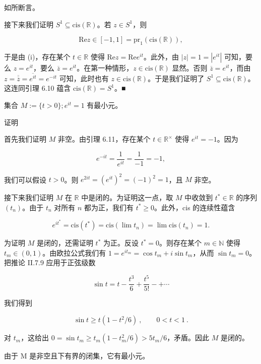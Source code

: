 \begin{lemma}
\begin{subitems}
如所断言。

\item

接下来我们证明 $ S^1 \subseteq \mathrm{cis}(\mathbb{R}) $。若 $ z \in S^1 $，则

\[
\mathrm{R e}z\in[-1,1]=\mathrm{p r}_{1}\left(\mathrm{c i s}(\mathbb{R})\right),
\]

于是由 (i)，存在某个 $t \in \mathbb{R}$ 使得 $\mathrm{Re} z = \mathrm{Re} e^{it}$。此外，由 $|z| = 1 = |e^{it}|$ 可知，要么 $z = e^{it}$，要么 $\overline{z} = e^{it}$。在第一种情形，$z \in \mathrm{cis}(\mathbb{R})$ 显然。否则 $\overline{z} = e^{it}$，而由 $z = \overline{\overline{z}} = \overline{e^{it}} = e^{-it}$ 可知，此时也有 $z \in \mathrm{cis}(\mathbb{R})$。于是我们证明了 $S^{1} \subseteq \mathrm{cis}(\mathbb{R})$。这连同引理 6.10 蕴含 $\mathrm{cis}(\mathbb{R}) = S^{1}$。■

\end{subitems}

\end{lemma}

\begin{lemma}

集合 $ M := \{t > 0\}; e^{it} = 1 $ 有最小元。

证明

\begin{subitems}
\item

首先我们证明 $ M $ 非空。由引理 6.11，存在某个 $ t \in \mathbb{R}^\times $ 使得 $ e^{it} = -1 $。因为

\[
e^{-it}=\frac{1}{e^{it}}=\frac{1}{-1}=-1,
\]

我们可以假设 $t>0$。则 $e^{2it}=(e^{it})^2=(-1)^2=1$，且 $M$ 非空。

\item

接下来我们证明 $ M $ 在 $ \mathbb{R} $ 中是闭的。为证明这一点，取 $ M $ 中收敛到 $ t^* \in \mathbb{R} $ 的序列 $ (t_n) $。由于 $ t_n $ 对所有 $ n $ 都为正，我们有 $ t^* \geq 0 $。此外，cis 的连续性蕴含

\[
e^{i t^{*}}=\mathrm{c i s}(t^{*})=\mathrm{c i s}(\lim t_{n})=\lim\mathrm{c i s}(t_{n})=1.
\]

为证明 $M$ 是闭的，还需证明 $t^*$ 为正。反设 $t^* = 0$。则存在某个 $m \in \mathbb{N}$ 使得 $t_m \in (0,1)$。由欧拉公式我们有 $1 = e^{it_m} = \cos t_m + i \sin t_m$，从而 $\sin t_m = 0$。
把推论 II.7.9 应用于正弦级数

\[
\sin t=t-\frac{t^{3}}{6}+\frac{t^{5}}{5!}-+\cdots
\]

我们得到

\begin{equation}
\sin t\geq t(1-t^{2}/6)~,\qquad0<t<1~.
\end{equation}

对 $t_m$，这给出 $0 = \sin t_m \geq t_m (1 - t_m^2/6) > 5t_m/6$，矛盾。因此 $M$ 是闭的。

\item

由于 M 是非空且下有界的闭集，它有最小元。

\end{subitems}

\end{lemma}


